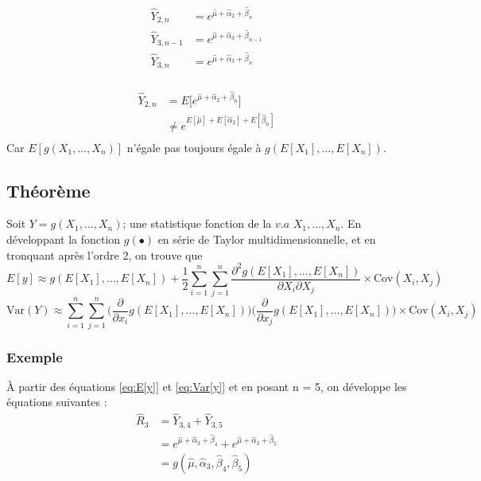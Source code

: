 \documentclass[11pt,french]{report}
\begin{document}
\begin{itemize}
\begin{align*}
\widehat{Y}_{2,n} &= e^{\widehat{\mu} + \widehat{\alpha}_2 + \widehat{\beta}_n} \\
\widehat{Y}_{3,n-1} &= e^{\widehat{\mu} + \widehat{\alpha}_3 + \widehat{\beta}_{n-1}} \\
\widehat{Y}_{3,n} &= e^{\widehat{\mu} + \widehat{\alpha}_3 + \widehat{\beta}_n} \\
\end{align*}

\end{itemize}

\begin{align*}
\widehat{Y}_{2,n} &= E \Bigg[ e^{\widehat{\mu} + \widehat{\alpha}_2 + \widehat{\beta}_n} \Bigg] \\
&\neq e^{E[\widehat{\mu}] + E[\widehat{\alpha}_2] + E[\widehat{\beta}_n]} \\
\end{align*}
Car $ E[g(X_1,...,X_n)]$ n'égale pas toujours égale à $g(E[X_1],...,E[X_n])$.

\subsection*{Théorème}
Soit $Y = g(X_1,...,X_n)$; une statistique fonction de la $v.a$ $X_1,...,X_n$. En développant la fonction $g(\bullet)$ en série de Taylor multidimensionnelle, et en tronquant après l'ordre 2, on trouve que
\begin{equation}
\label{eq:E[y]}
E[y] \approx g(E[X_1],...,E[X_n]) + \frac{1}{2} \sum_{i=1}^{n} \sum_{j=1}^{n} \frac{\partial^2 g(E[X_1],...,E[X_n])}{\partial X_i \partial X_j} \times \text{Cov}(X_i, X_j) 
\end{equation}
\begin{equation}
\label{eq:Var[y]}
\text{Var}(Y) \approx \sum_{i=1}^{n} \sum_{j=1}^{n} \Bigg( \frac{\partial}{\partial x_i} g(E[X_1],...,E[X_n]) \Bigg) \Bigg( \frac{\partial}{\partial x_j} g(E[X_1],...,E[X_n]) \Bigg) \times \text{Cov}(X_i, X_j)
\end{equation}

\subsubsection*{Exemple}
À partir des équations \ref{eq:E[y]} et \ref{eq:Var[y]} et en posant n = 5, on développe les équations suivantes :
\begin{align*}
\widehat{R}_3 &= \widehat{Y}_{3,4} + \widehat{Y}_{3,5} \\
&= e^{\widehat{\mu} + \widehat{\alpha}_3 + \widehat{\beta}_4} +  e^{\widehat{\mu} + \widehat{\alpha}_3 + \widehat{\beta}_5} \\
&= g(\widehat{\mu}, \widehat{\alpha}_3, \widehat{\beta}_4, \widehat{\beta}_5)
\end{align*}
\end{document}
